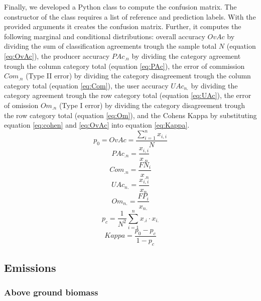 			Finally, we developed a Python class to compute the confusion matrix. The constructor of the class requires a list of reference and prediction labels. With the provided arguments it creates the confusion matrix. Further, it computes the following marginal and conditional distributions: overall accuracy $OvAc$ by dividing the sum of classification agreements trough the sample total $N$ (equation \ref{eq:OvAc}), the producer accuracy $PAc_{.n}$ by dividing the category agreement trough the column category total (equation \ref{eq:PAc}), the error of commission $Com_{.n}$ (Type II error) by dividing the category disagreement trough the column category total (equation \ref{eq:Com}), the user accuracy $UAc_{n.}$ by dividing the category agreement trough the row category total (equation \ref{eq:UAc}), the error of omission $Om_{.n}$ (Type I error) by dividing the category disagreement trough the row category total (equation \ref{eq:Om}), and the Cohens Kappa by substituting equation \ref{eq:cohen} and \ref{eq:OvAc} into equation \ref{eq:Kappa}.
			\begin{equation}
			\label{eq:OvAc}
				p_0=OvAc = \frac{\displaystyle\sum_{i=1}^{n}x_{i,i}}{N}
			\end{equation}
			\begin{equation}
			\label{eq:PAc}
				PAc_{.n} = \frac{x_{i,i}}{x_{.n}}
			\end{equation}
			\begin{equation}
			\label{eq:Com}
				Com_{.n} = \frac{FN_i}{x_{.n}}
			\end{equation}
			\begin{equation}
			\label{eq:UAc}
				UAc_{n.} = \frac{x_{i,i}}{x_{n.}}
			\end{equation}
			\begin{equation}
			\label{eq:Om}
				Om_{n.} = \frac{FP_i}{x_{n.}}
			\end{equation}
			\begin{equation}
			\label{eq:cohen}
				p_c = \frac{1}{N^2}\displaystyle\sum_{i=1}^{n} x_{.i} \cdot x_{i.}
			\end{equation}
			\begin{equation}
			\label{eq:Kappa}
				Kappa = \frac{p_0-p_c}{1-p_c}
			\end{equation}

	\subsection{Emissions}
		\subsubsection{Above ground biomass}
			\lipsum[1-2]
